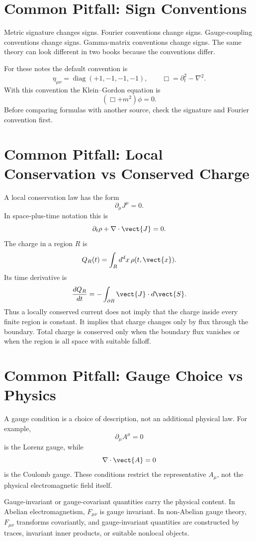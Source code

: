 \section{Common Pitfall: Sign Conventions}

Metric signature changes signs. Fourier conventions change signs. Gauge-coupling
conventions change signs. Gamma-matrix conventions change signs. The same theory
can look different in two books because the conventions differ.

For these notes the default convention is
\[
    \eta_{\mu\nu}=\operatorname{diag}(+1,-1,-1,-1),
    \qquad
    \Box=\partial_t^2-\nabla^2.
\]
With this convention the Klein--Gordon equation is
\[
    (\Box+m^2)\phi=0.
\]
Before comparing formulas with another source, check the signature and Fourier
convention first.

\section{Common Pitfall: Local Conservation vs Conserved Charge}

A local conservation law has the form
\[
    \partial_\mu J^\mu=0.
\]
In space-plus-time notation this is
\[
    \partial_t\rho+\nabla\cdot\vect{J}=0.
\]
The charge in a region \(R\) is
\[
    Q_R(t)=\int_R d^d x\,\rho(t,\vect{x}).
\]
Its time derivative is
\[
    \frac{dQ_R}{dt}=-\int_{\partial R}\vect{J}\cdot d\vect{S}.
\]
Thus a locally conserved current does not imply that the charge inside every
finite region is constant. It implies that charge changes only by flux through
the boundary. Total charge is conserved only when the boundary flux vanishes or
when the region is all space with suitable falloff.

\section{Common Pitfall: Gauge Choice vs Physics}

A gauge condition is a choice of description, not an additional physical law. For
example,
\[
    \partial_\mu A^\mu=0
\]
is the Lorenz gauge, while
\[
    \nabla\cdot\vect{A}=0
\]
is the Coulomb gauge. These conditions restrict the representative \(A_\mu\), not
the physical electromagnetic field itself.

Gauge-invariant or gauge-covariant quantities carry the physical content. In
Abelian electromagnetism, \(F_{\mu\nu}\) is gauge invariant. In non-Abelian gauge
theory, \(F_{\mu\nu}\) transforms covariantly, and gauge-invariant quantities are
constructed by traces, invariant inner products, or suitable nonlocal objects.

